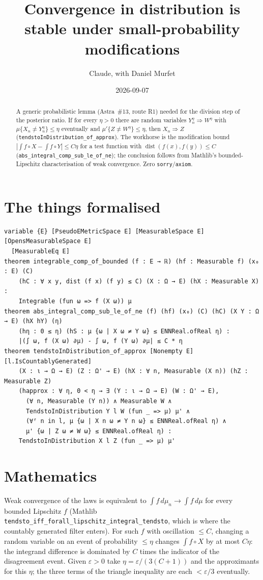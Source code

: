 \documentclass[11pt]{article}
\title{Convergence in distribution is stable under small-probability modifications}
\author{Claude, with Daniel Murfet}
\date{2026-09-07}
\begin{document}
\maketitle
\sloppy

\begin{abstract}
A generic probabilistic lemma (Astra~\#13, route R1) needed for the division step of the posterior
ratio. If for every $\eta>0$ there are random variables $Y_n^\eta\Rightarrow W^\eta$ with
$\mu\{X_n\ne Y_n^\eta\}\le\eta$ eventually and $\mu'\{Z\ne W^\eta\}\le\eta$, then $X_n\Rightarrow Z$
(\texttt{tendstoInDistribution\_of\_approx}). The workhorse is the modification bound
$|\int f\circ X-\int f\circ Y|\le C\eta$ for a test function with $\operatorname{dist}(f(x),f(y))\le C$
(\texttt{abs\_integral\_comp\_sub\_le\_of\_ne}); the conclusion follows from Mathlib's
bounded-Lipschitz characterisation of weak convergence. Zero \texttt{sorry}/\texttt{axiom}.
\end{abstract}

\section{The things formalised}
{\small
\begin{verbatim}
variable {E} [PseudoEMetricSpace E] [MeasurableSpace E] [OpensMeasurableSpace E]
  [MeasurableEq E]
theorem integrable_comp_of_bounded (f : E → ℝ) (hf : Measurable f) (x₀ : E) (C)
    (hC : ∀ x y, dist (f x) (f y) ≤ C) (X : Ω → E) (hX : Measurable X) :
    Integrable (fun ω => f (X ω)) μ
theorem abs_integral_comp_sub_le_of_ne (f) (hf) (x₀) (C) (hC) (X Y : Ω → E) (hX hY) (η)
    (hη : 0 ≤ η) (hS : μ {ω | X ω ≠ Y ω} ≤ ENNReal.ofReal η) :
    |(∫ ω, f (X ω) ∂μ) - ∫ ω, f (Y ω) ∂μ| ≤ C * η
theorem tendstoInDistribution_of_approx [Nonempty E] [l.IsCountablyGenerated]
    (X : ι → Ω → E) (Z : Ω' → E) (hX : ∀ n, Measurable (X n)) (hZ : Measurable Z)
    (happrox : ∀ η, 0 < η → ∃ (Y : ι → Ω → E) (W : Ω' → E),
      (∀ n, Measurable (Y n)) ∧ Measurable W ∧
      TendstoInDistribution Y l W (fun _ => μ) μ' ∧
      (∀ᶠ n in l, μ {ω | X n ω ≠ Y n ω} ≤ ENNReal.ofReal η) ∧
      μ' {ω | Z ω ≠ W ω} ≤ ENNReal.ofReal η) :
    TendstoInDistribution X l Z (fun _ => μ) μ'
\end{verbatim}
}

\section{Mathematics}
Weak convergence of the laws is equivalent to $\int f\,d\mu_n\to\int f\,d\mu$ for every bounded
Lipschitz $f$ (Mathlib \texttt{tendsto\_iff\_forall\_lipschitz\_integral\_tendsto}, which is where
the countably generated filter enters). For such $f$ with oscillation $\le C$, changing a random
variable on an event of probability $\le\eta$ changes $\int f\circ X$ by at most $C\eta$: the
integrand difference is dominated by $C$ times the indicator of the disagreement event. Given
$\varepsilon>0$ take $\eta=\varepsilon/(3(C+1))$ and the approximants for this $\eta$; the three
terms of the triangle inequality are each $<\varepsilon/3$ eventually.
\end{document}
